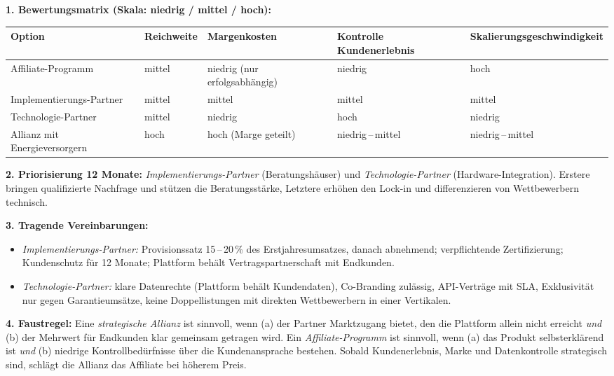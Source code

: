 \documentclass[11pt,a4paper,oneside]{article}
\begin{document}
\begin{loesungbox}
\textbf{1. Bewertungsmatrix (Skala: niedrig / mittel / hoch):}

\smallskip
\begin{tabularx}{\linewidth}{@{}lXXXX@{}}
\toprule
\textbf{Option} & \textbf{Reichweite} & \textbf{Margenkosten} & \textbf{Kontrolle Kundenerlebnis} & \textbf{Skalierungsgeschwindigkeit} \\
\midrule
Affiliate-Programm & mittel & niedrig (nur erfolgsabhängig) & niedrig & hoch \\
\midrule
Implementierungs-Partner & mittel & mittel & mittel & mittel \\
\midrule
Technologie-Partner & mittel & niedrig & hoch & niedrig \\
\midrule
Allianz mit Energieversorgern & hoch & hoch (Marge geteilt) & niedrig\,--\,mittel & niedrig\,--\,mittel \\
\bottomrule
\end{tabularx}

\smallskip
\textbf{2. Priorisierung 12 Monate:}
\emph{Implementierungs-Partner} (Beratungshäuser) und \emph{Technologie-Partner} (Hardware-Integration). Erstere bringen qualifizierte Nachfrage und stützen die Beratungsstärke, Letztere erhöhen den Lock-in und differenzieren von Wettbewerbern technisch.

\smallskip
\textbf{3. Tragende Vereinbarungen:}
\begin{itemize}
  \item \emph{Implementierungs-Partner:} Provisionssatz 15\,--\,20\,\% des Erstjahresumsatzes, danach abnehmend; verpflichtende Zertifizierung; Kundenschutz für 12 Monate; Plattform behält Vertragspartnerschaft mit Endkunden.
  \item \emph{Technologie-Partner:} klare Datenrechte (Plattform behält Kundendaten), Co-Branding zulässig, API-Verträge mit SLA, Exklusivität nur gegen Garantieumsätze, keine Doppellistungen mit direkten Wettbewerbern in einer Vertikalen.
\end{itemize}

\smallskip
\textbf{4. Faustregel:}
Eine \emph{strategische Allianz} ist sinnvoll, wenn (a) der Partner Marktzugang bietet, den die Plattform allein nicht erreicht \emph{und} (b) der Mehrwert für Endkunden klar gemeinsam getragen wird. Ein \emph{Affiliate-Programm} ist sinnvoll, wenn (a) das Produkt selbsterklärend ist \emph{und} (b) niedrige Kontrollbedürfnisse über die Kundenansprache bestehen. Sobald Kundenerlebnis, Marke und Datenkontrolle strategisch sind, schlägt die Allianz das Affiliate \textendash{} bei höherem Preis.
\end{loesungbox}
\end{document}
